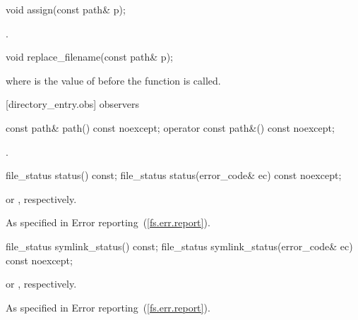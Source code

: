 %
\begin{itemdecl}
void assign(const path& p);
\end{itemdecl}

\begin{itemdescr}
\pnum
\postconditions {}.
\end{itemdescr}

%
\begin{itemdecl}
void replace_filename(const path& p);
\end{itemdecl}

\begin{itemdescr}
\pnum
\postconditions {} where
   is the value of  before the function is
  called.
\end{itemdescr}

[directory_entry.obs]{ observers}

%
%
\begin{itemdecl}
const path& path() const noexcept;
operator const path&() const noexcept;
\end{itemdecl}

\begin{itemdescr}
\pnum
\returns {}.
\end{itemdescr}

%
\begin{itemdecl}
file_status status() const;
file_status status(error_code& ec) const noexcept;
\end{itemdecl}

\begin{itemdescr}
\pnum
\returns {} or , respectively.

\pnum
\throws As specified in Error reporting~(\ref{fs.err.report}).
\end{itemdescr}

%
\begin{itemdecl}
file_status symlink_status() const;
file_status symlink_status(error_code& ec) const noexcept;
\end{itemdecl}

\begin{itemdescr}
\pnum
\returns {} or , respectively.

\pnum
\throws As specified in Error reporting~(\ref{fs.err.report}).
\end{itemdescr}

